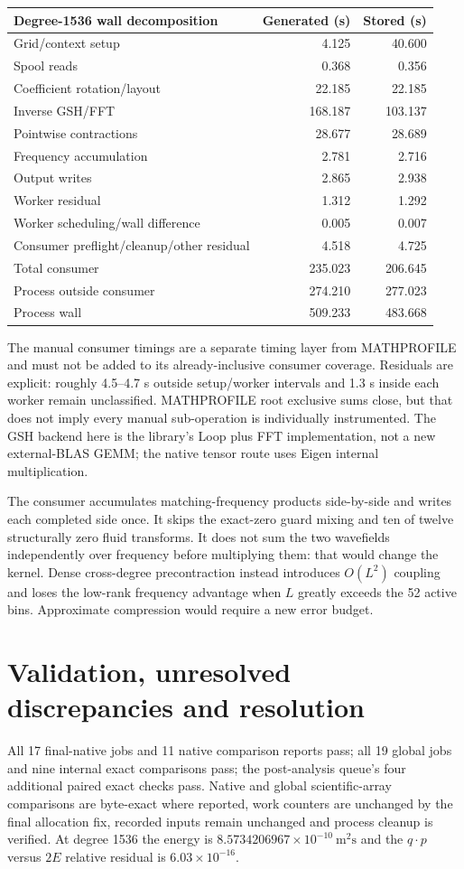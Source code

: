 \documentclass[11pt,a4paper]{article}
\begin{document}
\begin{center}
\small
\begin{tabular}{p{10cm}rr}
\toprule
Degree-1536 wall decomposition & Generated (s) & Stored (s) \\
\midrule
Grid/context setup & 4.125 & 40.600 \\
Spool reads & 0.368 & 0.356 \\
Coefficient rotation/layout & 22.185 & 22.185 \\
Inverse GSH/FFT & 168.187 & 103.137 \\
Pointwise contractions & 28.677 & 28.689 \\
Frequency accumulation & 2.781 & 2.716 \\
Output writes & 2.865 & 2.938 \\
Worker residual & 1.312 & 1.292 \\
Worker scheduling/wall difference & 0.005 & 0.007 \\
Consumer preflight/cleanup/other residual & 4.518 & 4.725 \\
Total consumer & 235.023 & 206.645 \\
Process outside consumer & 274.210 & 277.023 \\
Process wall & 509.233 & 483.668 \\
\bottomrule
\end{tabular}
\end{center}
The manual consumer timings are a separate timing layer from MATHPROFILE and must not be added to its already-inclusive consumer coverage. Residuals are explicit: roughly 4.5--4.7 s outside setup/worker intervals and 1.3 s inside each worker remain unclassified. MATHPROFILE root exclusive sums close, but that does not imply every manual sub-operation is individually instrumented. The GSH backend here is the library's Loop plus FFT implementation, not a new external-BLAS GEMM; the native tensor route uses Eigen internal multiplication.

The consumer accumulates matching-frequency products side-by-side and writes each completed side once. It skips the exact-zero guard mixing and ten of twelve structurally zero fluid transforms. It does not sum the two wavefields independently over frequency before multiplying them: that would change the kernel. Dense cross-degree precontraction instead introduces $O(L^2)$ coupling and loses the low-rank frequency advantage when $L$ greatly exceeds the 52 active bins. Approximate compression would require a new error budget.
\section{Validation, unresolved discrepancies and resolution}
All 17 final-native jobs and 11 native comparison reports pass; all 19 global jobs and nine internal exact comparisons pass; the post-analysis queue's four additional paired exact checks pass. Native and global scientific-array comparisons are byte-exact where reported, work counters are unchanged by the final allocation fix, recorded inputs remain unchanged and process cleanup is verified. At degree 1536 the energy is $8.5734206967\times10^{-10}\ \mathrm{m}^2\mathrm{s}$ and the $q\cdot p$ versus $2E$ relative residual is $6.03\times10^{-16}$.
\end{document}
